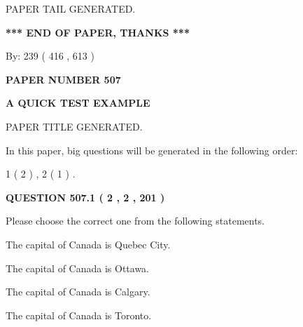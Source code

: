 \documentclass[12pt]{article}
\begin{document}
   
   
   
   
   
 \vspace{0.2in}
 
   
   
\vspace{2.0in} PAPER TAIL GENERATED.
   
   
   
   
\vspace{1.0in} 
{\textbf{\large{ *** END OF PAPER, THANKS *** }}} 
   
   
\hspace{1.0in} By: 
 239 ( 416 ,  613 )
   
   
   
   
\newpage 
\setcounter{page}{ 
   507001 } 
   
   
   
   
 {\textbf{ \Large{ PAPER NUMBER  507  }}}
   
   
\vspace{0.2in}
   
   
   
   
   
   
   
   
 \vspace{0.2in}
{\LARGE {\textbf{ A QUICK TEST EXAMPLE}}}
   
   
 PAPER TITLE GENERATED.
   
   
   
\vspace{0.2in}
   
In this paper, big questions will be generated in the following order: 
   
   
   1 ( 2 )
 ,
   2 ( 1 )
 .
  
\vspace{0.2in}
  
{\textbf{\Large{QUESTION
507.1 
 ( 2 , 2 , 201 )
}}}
  
  
Please choose the correct one from the following statements.
 
 
The capital of Canada is Quebec City.
 
 
The capital of Canada is Ottawa.
 
 
The capital of Canada is Calgary.
 
 
The capital of Canada is Toronto.
 
\end{document}
